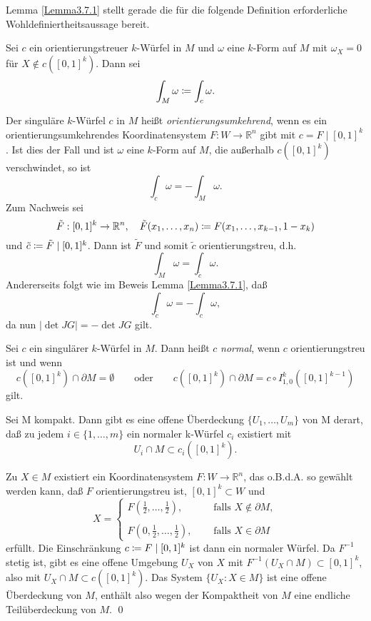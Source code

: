 \documentclass[a4paper,twoside,DIV15,BCOR12mm]{scrbook}
\begin{document}
\bigskip

\noindent
Lemma \ref{Lemma3.7.1} stellt gerade  die für die folgende Definition 
erforderliche Wohldefiniertheitsaussage bereit.

\bigskip

 Sei $c$ ein orientierungstreuer 
$k$-Würfel in $M$ und $\omega$ eine $k$-Form auf $M$ mit $\omega_{X} = 0$ 
für $X \notin c([0,1]^{k})$. Dann sei
\[ \int_{M} \omega \da  \int_{c} \omega. \]

\bigskip

\noindent
Der singuläre $k$-Würfel $c$ in $M$ heißt {\em orientierungsumkehrend}, wenn es 
ein orientierungsumkehrendes Koordinatensystem $F: W \to {\mathbb R}^{n}$ 
gibt mit $c = F \mid [0,1]^{k}$. Ist dies der Fall und ist 
$\omega$ eine $k$-Form auf $M$, die außerhalb $c([0,1]^{k})$ verschwindet, 
so ist
\[ \int_{c} \omega = - \int_{M} \omega. \]
Zum Nachweis sei\[ \tilde{F} : [0,1]^{k} \to {\mathbb R}^{n}, \quad 
\tilde{F}(x_{1},\dots,x_{n}) \da  F(x_{1},\dots,x_{k-1},1 - x_{k}) \]
und $\tilde{c} \da  \tilde{F} \mid [0,1]^{k}$. Dann ist $\tilde{F}$ und 
somit $\tilde{c}$ orientierungstreu, d.h.
\[ \int_{M} \omega = \int_{\tilde{c}} \omega. \]
Andererseits folgt wie im Beweis Lemma \ref{Lemma3.7.1}, daß
\[ \int_{\tilde{c}} \omega = -\int_{c} \omega, \]
da nun $|\det JG|=-\det JG$ gilt.

\bigskip

 Sei $c$ ein singulärer $k$-Würfel in $M$. 
Dann heißt $c$ {\em normal}, wenn $c$ orientierungstreu ist und wenn
\[ c([0,1]^{k}) \cap \partial M = \emptyset \qquad\mbox{oder}\qquad c([0,1]^{k}) \cap \partial M = c \circ I_{1,0}^{k}([0,1]^{k-1}) \]
gilt.

\bigskip

\begin{lemma}\label{Lemma3.7.2} {Sei M kompakt. Dann gibt es eine offene 
Überdeckung $\{U_{1},\dots,U_{m}\}$ von M derart, 
daß zu jedem $i \in \{1,\dots,m\}$ ein normaler k-Würfel 
$c_{i}$ existiert mit}\[ U_{i} \cap M \subset c_{i}([0,1]^{k}). \]
\end{lemma}

\bigskip

 Zu $X \in M$ existiert ein Koordinatensystem 
$F: W \to {\mathbb R}^{n}$, das o.B.d.A. so gewählt werden kann, 
daß $F$ orientierungstreu ist, $[0,1]^{k} \subset W$ und
\[ X = \left\{ \begin{array}{ll}  F\left(\frac{1}{2},\dots,\frac{1}{2} \right), 
\quad & \mbox{ falls } X \notin \partial M, \\ \\
F\left(0,\frac{1}{2},\dots,\frac{1}{2}\right), \quad & 
\mbox{ falls } X \in \partial M \end{array} \right. 
\]
erfüllt. Die Einschränkung $c \da  F \mid [0,1]^{k}$ ist dann ein normaler 
Würfel. Da $F^{-1}$ stetig ist, gibt es eine offene Umgebung $U_{X}$ 
von $X$ mit $F^{-1}(U_{X} \cap M) \subset [0,1]^{k}$, also mit 
$U_{X} \cap M \subset c([0,1]^{k})$. Das System $\{U_{X}: X \in M\}$ 
ist eine offene Überdeckung von $M$, enthält also wegen der Kompaktheit von $M$ eine 
endliche Teilüberdeckung von $M$. \qed\\
\end{document}
